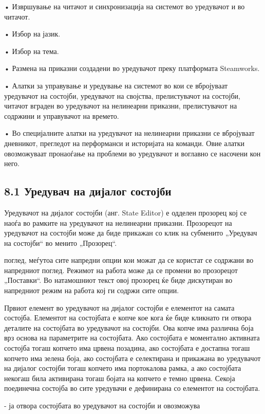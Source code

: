 • Извршување на читачот и синхронизација на системот во уредувачот и во читачот.

• Избор на јазик.

• Избор на тема.

• Размена на приказни создадени во уредувачот преку платформата Steamworks.

• Алатки за управување и уредување на системот во кои се вбројуваат уредувачот на состојби, уредувачот на својства, прелистувачот на состојби, читачот вграден во уредувачот на нелинеарни приказни, прелистувачот на содржини и управувачот на времето.

• Во специјалните алатки на уредувачот на нелинеарни приказни се вбројуваат дневникот, прегледот на перформанси и историјата на команди. Овие алатки овозможуваат пронаоѓање на проблеми во уредувачот и воглавно се насочени кон него.

\subsection{8.1 Уредувач на дијалог состојби}

Уредувачот на дијалог состојби (анг. State Editor) е одделен прозорец кој се наоѓа во рамките на уредувачот на нелинеарни приказни. Прозорецот на уредувачот на состојби може да биде прикажан со клик на субменито „Уредувач на состојби“ во менито „Прозорец“.


поглед, меѓутоа сите напредни опции кои можат да се користат се содржани во напредниот поглед. Режимот на работа може да се промени во прозорецот „Поставки“. Во натамошниот текст овој прозорец ќе биде дискутиран во напредниот режим на работа кој ги содржи сите опции.

Првиот елемент во уредувачот на дијалог состојби е елементот на самата состојба. Елементот на состојбата е копче кое кога ќе биде кликнато ги отвора деталите на состојбата во уредувачот на состојби. Ова копче има различна боја врз основа на параметрите на состојбата. Ако состојбата е моментално активната состојба тогаш копчето има црвена позадина, ако состојбата е достапна тогаш копчето има зелена боја, ако состојбата е селектирана и прикажана во уредувачот на дијалог состојби тогаш копчето има портокалова рамка, а ако состојбата некогаш била активирана тогаш бојата на копчето е темно црвена. Секоја поединечна состојба во сите уредувачи е дефинирана со елементот на состојбата.


- ја отвора состојбата во уредувачот на состојби и овозможува

